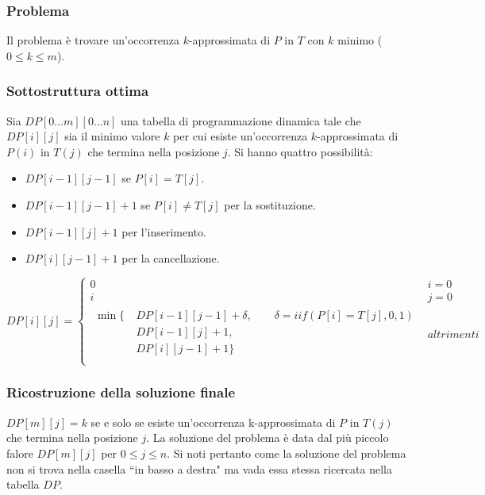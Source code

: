 \subsubsection{Problema}
Il problema \`e trovare un'occorrenza $k$-approssimata di $P$ in $T$ con $k$ minimo ($0\le k \le m$).
\subsubsection{Sottostruttura ottima}
Sia $DP[0\dots m][0\dots n]$ una tabella di programmazione dinamica tale che $DP[i][j]$ sia il minimo valore $k$ per cui esiste un'occorrenza $k$-approssimata di $P(i)$ in $T(j)$ che
termina nella posizione $j$. Si hanno quattro possibilit\`a:
\begin{itemize}
	\item $DP[i-1][j-1]$ se $P[i]=T[j]$.
	\item $DP[i-1][j-1]+1$ se $P[i]\neq T[j]$ per la sostituzione.
	\item $DP[i-1][j]+1$ per l'inserimento.
	\item $DP[i][j-1]+1$ per la cancellazione.
\end{itemize}
$$DP[i][j] =
\begin{cases}
	0 & i = 0\\
	i & j = 0\\
\begin{split}
	\min\{\	& DP[i-1][j-1]+\delta, \quad\quad \delta = iif(P[i]=T[j], 0, 1)\\
		& DP[i-1][j]+1, \\
		& DP[i][j-1]+1\} \\
	\end{split}& altrimenti
\end{cases}$$
\subsubsection{Ricostruzione della soluzione finale}
$DP[m][j] = k$ se e solo se esiste un'occorrenza k-approssimata di $P$ in $T(j)$ che termina nella posizione $j$. La soluzione del problema \`e data dal pi\`u piccolo falore $DP[m][j]$ 
per $0\le j\le n$. Si noti pertanto come la soluzione del problema non si trova nella casella ``in basso a destra" ma vada essa stessa ricercata nella tabella $DP$.
